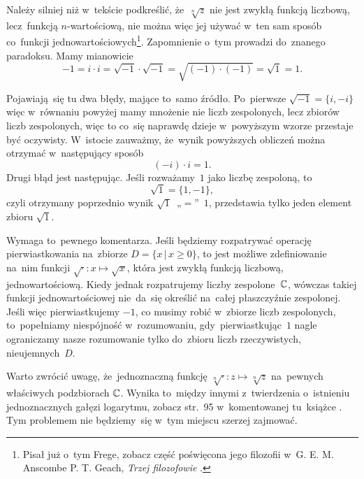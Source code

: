 \documentclass[a4paper,11pt]{article}
\numberwithin{equation}{section}
\begin{document}
\VerSpaceFour





\noindent
{} Należy silniej niż w~tekście podkreślić,
że~$\sqrt[n]{ z }$ nie jest zwykłą funkcją liczbową, lecz~funkcją
$n$-wartościową, nie można więc jej używać w~ten sam sposób co~funkcji
jednowartościowych\footnote{Pisał już o~tym Frege, zobacz część
  poświęcona jego filozofii w~G. E. M. Anscombe P. T. Geach,
  \textit{Trzej filozofowie} \cite{AnscombeGeachTrzejFilozofowie1981}.}.
Zapomnienie o~tym prowadzi do~znanego paradoksu. Mamy mianowicie
\begin{equation}
  \label{eq:Leja-Funkcje-zespolone-08}
  -1 = i \cdot i = \sqrt{ -1 } \cdot \sqrt{ -1 } = \sqrt{ ( -1 ) \cdot ( -1 ) }
  = \sqrt{ 1 } = 1.
\end{equation}

Pojawiają~się tu dwa błędy, mające to~samo źródło. Po~pierwsze
$\sqrt{ -1 } = \{ i, -i \}$ więc w~równaniu powyżej mamy mnożenie nie
liczb zespolonych, lecz zbiorów liczb zespolonych, więc to co~się
naprawdę dzieje w~powyższym wzorze przestaje być oczywisty. W~istocie
zauważmy, że~wynik powyższych obliczeń można otrzymać w~następujący
sposób
\begin{equation}
  \label{eq:Leja-Funkcje-zespolone-09}
  ( -i ) \cdot i = 1.
\end{equation}
Drugi błąd jest następując. Jeśli rozważamy~$1$ jako liczbę zespoloną,
to
\begin{equation}
  \label{eq:Leja-Funkcje-zespolone-10}
  \sqrt{ 1 } = \{ 1, -1 \},
\end{equation}
czyli otrzymany poprzednio wynik $\sqrt{ 1 }$~„$=$”~$1$, przedstawia
tylko jeden element zbioru $\sqrt{ 1 }$.

Wymaga to~pewnego komentarza. Jeśli będziemy rozpatrywać operację
pierwiastkowania na~zbiorze $D = \{ x \, | \, x \geq 0 \}$, to jest
możliwe zdefiniowanie na~nim funkcji
$\sqrt{ \cdot }: x \mapsto \sqrt{ x }$, która jest zwykłą funkcją
liczbową, jednowartościową. Kiedy jednak rozpatrujemy liczby
zespolone~$\mathbb{C}$, wówczas takiej funkcji jednowartościowej nie~da~się
określić na~całej płaszczyźnie zespolonej. Jeśli więc pierwiastkujemy
$-1$, co musimy robić w~zbiorze liczb zespolonych, to~popełniamy
niespójność w~rozumowaniu, gdy~pierwiastkując~$1$ nagle ograniczamy
nasze rozumowanie tylko do~zbioru liczb rzeczywistych,
nieujemnych~$D$.

Warto zwrócić uwagę, że~jednoznaczną funkcję
$\sqrt[ n ]{ \cdot }: z \mapsto \sqrt[ n ]{ z }$ na~pewnych właściwych
podzbiorach $\mathbb{C}$. Wynika to~między innymi z~twierdzenia o~istnieniu
jednoznacznych gałęzi logarytmu, zobacz str.~95 w~komentowanej
tu~książce \parencite{Leja-Funkcje-zespolone-Pub-2006}. Tym problemem nie
będziemy~się w~tym miejscu szerzej zajmować.
\end{document}
